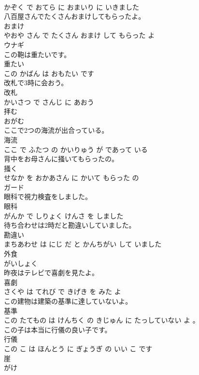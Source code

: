 \documentclass[8pt]{extreport}
\begin{document}
\begin{CJK}{UTF8}{min}
\\	かぞく で おてら に おまいり に いきました			
\\	八百屋さんでたくさんおまけしてもらったよ。	
\\	おまけ 
\\	やおや さん で たくさん おまけ して もらった よ			
\\	ウナギ	
\\	この鞄は重たいです。	
\\	重たい 
\\	この かばん は おもたい です			
\\	改札で3時に会おう。	
\\	改札 
\\	かいさつ で さんじ に あおう			
\\	拝む	
\\	おがむ			
\\	ここで2つの海流が出合っている。	
\\	海流 
\\	ここ で ふたつ の かいりゅう が であって いる			
\\	背中をお母さんに掻いてもらったの。	
\\	掻く 
\\	せなか を おかあさん に かいて もらった の			
\\	ガード	
\\	眼科で視力検査をしました。	
\\	眼科 
\\	がんか で しりょく けんさ を しました			
\\	待ち合わせは2時だと勘違いしていました。	
\\	勘違い 
\\	まちあわせ は にじ だ と かんちがい して いました			
\\	外食	
\\	がいしょく			
\\	昨夜はテレビで喜劇を見たよ。	
\\	喜劇 
\\	さくや は てれび で きげき を みた よ			
\\	この建物は建築の基準に達していないよ。	
\\	基準 
\\	この たてもの は けんちく の きじゅん に たっしていない よ 。			
\\	この子は本当に行儀の良い子です。	
\\	行儀 
\\	この こ は ほんとう に ぎょうぎ の いい こ です			
\\	崖	
\\	がけ			

\end{CJK}
\end{document}
